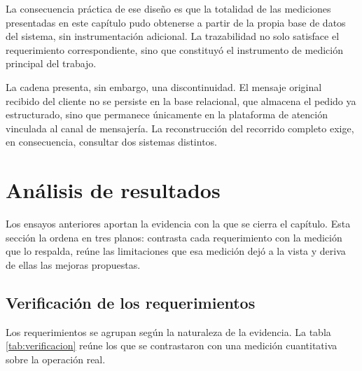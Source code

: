 La consecuencia práctica de ese diseño es que la totalidad de las mediciones presentadas en este capítulo pudo obtenerse a partir de la propia base de datos del sistema, sin instrumentación adicional. La trazabilidad no solo satisface el requerimiento correspondiente, sino que constituyó el instrumento de medición principal del trabajo.

La cadena presenta, sin embargo, una discontinuidad. El mensaje original recibido del cliente no se persiste en la base relacional, que almacena el pedido ya estructurado, sino que permanece únicamente en la plataforma de atención vinculada al canal de mensajería. La reconstrucción del recorrido completo exige, en consecuencia, consultar dos sistemas distintos.


\section{Análisis de resultados}
\label{sec:analisis_resultados}

Los ensayos anteriores aportan la evidencia con la que se cierra el capítulo. Esta sección la ordena en tres planos: contrasta cada requerimiento con la medición que lo respalda, reúne las limitaciones que esa medición dejó a la vista y deriva de ellas las mejoras propuestas.

\subsection{Verificación de los requerimientos}
\label{subsec:verificacion_requerimientos}

Los requerimientos se agrupan según la naturaleza de la evidencia. La tabla \ref{tab:verificacion} reúne los que se contrastaron con una medición cuantitativa sobre la operación real.

